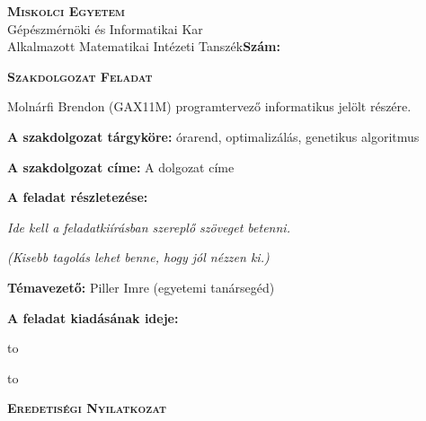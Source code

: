 \documentclass[12pt,a4paper]{report}
\begin{document}
\newpage

\pagestyle{empty}
\begin{flushleft}
\textsc{\bfseries Miskolci Egyetem}\\
Gépészmérnöki és Informatikai Kar\\
Alkalmazott Matematikai Intézeti Tanszék\hspace*{4cm}\hfil \textbf{Szám:}
\end{flushleft}
\vskip 0.5cm
\begin{center}
\large\textsc{\bfseries Szakdolgozat Feladat}
\end{center}
\vskip 0.5cm
Molnárfi Brendon (GAX11M) programtervező informatikus jelölt részére.\newline

\noindent\textbf{A szakdolgozat tárgyköre:} órarend, optimalizálás, genetikus algoritmus\newline

\noindent\textbf{A szakdolgozat címe:} A dolgozat címe\newline

\noindent\textbf{A feladat részletezése:}

\medskip

\emph{Ide kell a feladatkiírásban szereplő szöveget betenni.}

\medskip

\emph{(Kisebb tagolás lehet benne, hogy jól nézzen ki.)}

\vfill

\noindent\textbf{Témavezető:} Piller Imre (egyetemi tanársegéd) \newline


\noindent\textbf{A feladat kiadásának ideje:}\newline


\vskip 2cm

\hbox to 

\hbox to 

\newpage

\vspace*{1cm}  
\begin{center}
\large\textsc{\bfseries Eredetiségi Nyilatkozat}
\end{center}
\vspace*{2cm}  
\end{document}
